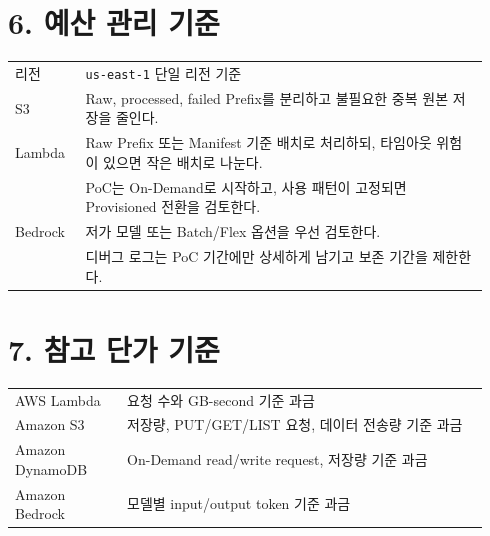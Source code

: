 \documentclass[12pt,a4paper]{article}
\newcommand{\DocNeedspace}[1]{\par\ifdim\dimexpr\pagegoal-\pagetotal\relax<#1\newpage\fi}
\begin{document}
\newpage

\DocNeedspace{10\baselineskip}
\section*{6. 예산 관리 기준}


\DocNeedspace{18\baselineskip}
\begin{small}
\begin{longtable}{@{}>{\RaggedRight\arraybackslash}m{0.140\linewidth}>{\RaggedRight\arraybackslash}m{0.800\linewidth}@{}}
\toprule
\multicolumn{1}{>{\centering\arraybackslash}m{0.140\linewidth}}{\textbf{관리 항목}} & \multicolumn{1}{>{\centering\arraybackslash}m{0.800\linewidth}}{\textbf{기준}} \\
\midrule
\endhead
리전 & \texttt{us-\allowbreak{}east-\allowbreak{}1} 단일 리전 기준 \\
S3 & Raw, processed, failed Prefix를 분리하고 불필요한 중복 원본 저장을 줄인다. \\
Lambda & Raw Prefix 또는 Manifest 기준 배치로 처리하되, 타임아웃 위험이 있으면 작은 배치로 나눈다. \\
{\scriptsize DynamoDB} & PoC는 On-Demand로 시작하고, 사용 패턴이 고정되면 Provisioned 전환을 검토한다. \\
Bedrock & 저가 모델 또는 Batch/Flex 옵션을 우선 검토한다. \\
{\scriptsize CloudWatch} & 디버그 로그는 PoC 기간에만 상세하게 남기고 보존 기간을 제한한다. \\
\bottomrule
\end{longtable}
\end{small}


\newpage

\DocNeedspace{10\baselineskip}
\section*{7. 참고 단가 기준}


\DocNeedspace{14\baselineskip}
\begin{small}
\begin{longtable}{@{}>{\RaggedRight\arraybackslash}m{0.222\linewidth}>{\RaggedRight\arraybackslash}m{0.718\linewidth}@{}}
\toprule
\multicolumn{1}{>{\centering\arraybackslash}m{0.222\linewidth}}{\textbf{서비스}} & \multicolumn{1}{>{\centering\arraybackslash}m{0.718\linewidth}}{\textbf{기준}} \\
\midrule
\endhead
AWS Lambda & 요청 수와 GB-second 기준 과금 \\
Amazon S3 & 저장량, PUT/GET/LIST 요청, 데이터 전송량 기준 과금 \\
Amazon DynamoDB & On-Demand read/write request, 저장량 기준 과금 \\
Amazon Bedrock & 모델별 input/output token 기준 과금 \\
\bottomrule
\end{longtable}
\end{small}
\end{document}
